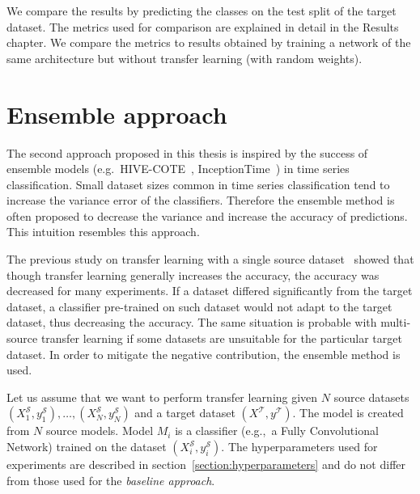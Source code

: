 \documentclass[a4paper,11pt,twoside]{report}
\theoremstyle{definition}
\begin{document}
We compare the results by predicting the classes on the test split of the target dataset. The metrics used for comparison are explained in detail in the Results chapter. We compare the metrics to results obtained by training a network of the same architecture but without transfer learning (with random weights).

\section{Ensemble approach}\label{section:ensemble}
The second approach proposed in this thesis is inspired by the success of ensemble models (e.g.~HIVE-COTE~\cite{hivecote}, InceptionTime~\cite{inceptiontime}) in time series classification. Small dataset sizes common in time series classification tend to increase the variance error of the classifiers. Therefore the ensemble method is often proposed to decrease the variance and increase the accuracy of predictions. This intuition resembles this approach.

The previous study on transfer learning with a single source dataset~\cite{transfer_learning_time_series} showed that though transfer learning generally increases the accuracy, the accuracy was decreased for many experiments. If a dataset differed significantly from the target dataset, a classifier pre-trained on such dataset would not adapt to the target dataset, thus decreasing the accuracy. The same situation is probable with multi-source transfer learning if some datasets are unsuitable for the particular target dataset. In order to mitigate the negative contribution, the ensemble method is used.

Let us assume that we want to perform transfer learning given $N$ source datasets $(X^\mathcal{S}_1, y^\mathcal{S}_1), \dots, (X^\mathcal{S}_N, y^\mathcal{S}_N)$ and a target dataset $(X^\mathcal{T}, y^\mathcal{T})$.
The model is created from $N$ source models. Model $M_i$ is a classifier (e.g.,~a Fully Convolutional Network) trained on the dataset $(X^\mathcal{S}_i, y^\mathcal{S}_i)$. The hyperparameters used for experiments are described in section~\ref{section:hyperparameters} and do not differ from those used for the \textit{baseline approach}.
\end{document}
